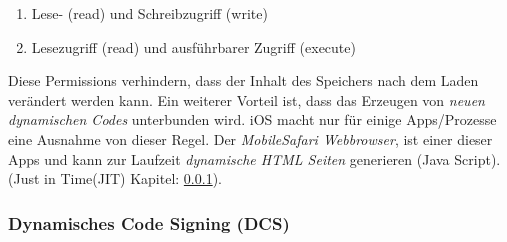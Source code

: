 \begin{enumerate}
    \item Lese- (read) und Schreibzugriff (write)
    \item Lesezugriff (read) und ausführbarer Zugriff (execute)
\end{enumerate}
Diese Permissions verhindern, dass der Inhalt des Speichers nach dem Laden verändert werden kann. Ein weiterer Vorteil ist, dass das Erzeugen von \textit{\glqq neuen dynamischen Codes\grqq{}} unterbunden wird. iOS macht  nur für einige Apps/Prozesse eine Ausnahme von dieser Regel. Der \textit{\glqq MobileSafari Webbrowser\grqq}, ist einer dieser Apps und kann zur Laufzeit \textit{\glqq dynamische HTML Seiten\grqq{}} generieren (Java Script). (Just in Time(JIT) Kapitel: \ref{sec:Jit}).



\subsubsection{Dynamisches Code Signing (DCS)}
\label{sec:Jit}

